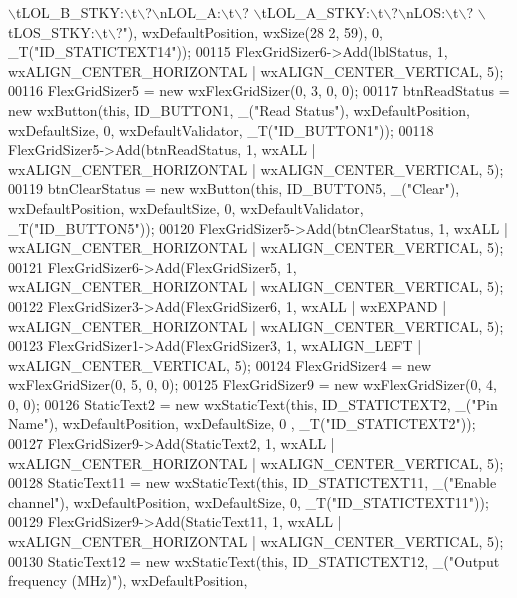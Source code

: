 \begin{DoxyCode}
{       \(\backslash\)tLOL\_B\_STKY:\(\backslash\)t\(\backslash\)?\(\backslash\)nLOL\_A:\(\backslash\)t\(\backslash\)?  \(\backslash\)tLOL\_A\_STKY:\(\backslash\)t\(\backslash\)?\(\backslash\)nLOS:\(\backslash\)t\(\backslash\)?  \(\backslash\)tLOS\_STKY:\(\backslash\)t\(\backslash\)?"}), wxDefaultPosition, wxSize(28
      2, 59), 0, _T(\textcolor{stringliteral}{"ID\_STATICTEXT14"}));
00115     FlexGridSizer6->Add(lblStatus, 1, wxALIGN\_CENTER\_HORIZONTAL | wxALIGN\_CENTER\_VERTICAL, 5);
00116     FlexGridSizer5 = \textcolor{keyword}{new} wxFlexGridSizer(0, 3, 0, 0);
00117     btnReadStatus = \textcolor{keyword}{new} wxButton(\textcolor{keyword}{this}, ID\_BUTTON1, \_(\textcolor{stringliteral}{"Read Status"}), wxDefaultPosition, wxDefaultSize, 0, 
      wxDefaultValidator, _T(\textcolor{stringliteral}{"ID\_BUTTON1"}));
00118     FlexGridSizer5->Add(btnReadStatus, 1, wxALL | wxALIGN\_CENTER\_HORIZONTAL | wxALIGN\_CENTER\_VERTICAL, 5);
00119     btnClearStatus = \textcolor{keyword}{new} wxButton(\textcolor{keyword}{this}, ID\_BUTTON5, \_(\textcolor{stringliteral}{"Clear"}), wxDefaultPosition, wxDefaultSize, 0, 
      wxDefaultValidator, _T(\textcolor{stringliteral}{"ID\_BUTTON5"}));
00120     FlexGridSizer5->Add(btnClearStatus, 1, wxALL | wxALIGN\_CENTER\_HORIZONTAL | wxALIGN\_CENTER\_VERTICAL, 5);
00121     FlexGridSizer6->Add(FlexGridSizer5, 1, wxALIGN\_CENTER\_HORIZONTAL | wxALIGN\_CENTER\_VERTICAL, 5);
00122     FlexGridSizer3->Add(FlexGridSizer6, 1, wxALL | wxEXPAND | wxALIGN\_CENTER\_HORIZONTAL | 
      wxALIGN\_CENTER\_VERTICAL, 5);
00123     FlexGridSizer1->Add(FlexGridSizer3, 1, wxALIGN\_LEFT | wxALIGN\_CENTER\_VERTICAL, 5);
00124     FlexGridSizer4 = \textcolor{keyword}{new} wxFlexGridSizer(0, 5, 0, 0);
00125     FlexGridSizer9 = \textcolor{keyword}{new} wxFlexGridSizer(0, 4, 0, 0);
00126     StaticText2 = \textcolor{keyword}{new} wxStaticText(\textcolor{keyword}{this}, ID\_STATICTEXT2, \_(\textcolor{stringliteral}{"Pin Name"}), wxDefaultPosition, wxDefaultSize, 0
      , _T(\textcolor{stringliteral}{"ID\_STATICTEXT2"}));
00127     FlexGridSizer9->Add(StaticText2, 1, wxALL | wxALIGN\_CENTER\_HORIZONTAL | wxALIGN\_CENTER\_VERTICAL, 5);
00128     StaticText11 = \textcolor{keyword}{new} wxStaticText(\textcolor{keyword}{this}, ID\_STATICTEXT11, \_(\textcolor{stringliteral}{"Enable channel"}), wxDefaultPosition, 
      wxDefaultSize, 0, _T(\textcolor{stringliteral}{"ID\_STATICTEXT11"}));
00129     FlexGridSizer9->Add(StaticText11, 1, wxALL | wxALIGN\_CENTER\_HORIZONTAL | wxALIGN\_CENTER\_VERTICAL, 5);
00130     StaticText12 = \textcolor{keyword}{new} wxStaticText(\textcolor{keyword}{this}, ID\_STATICTEXT12, \_(\textcolor{stringliteral}{"Output frequency (MHz)"}), wxDefaultPosition, 

\end{DoxyCode}
